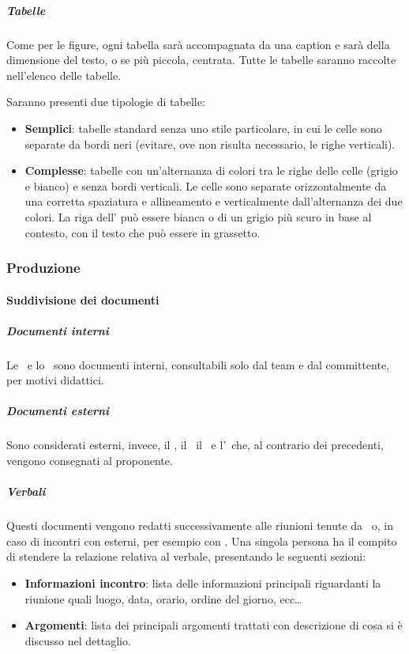 			\subparagraph{Tabelle}
			Come per le figure, ogni tabella sarà accompagnata da una caption e sarà della dimensione del testo, o se più piccola, centrata.
			Tutte le tabelle saranno raccolte nell'elenco delle tabelle.\par
			Saranno presenti due tipologie di tabelle:
			\begin{itemize}
				\item \textbf{Semplici}: tabelle standard senza uno stile particolare, in cui le celle sono separate da bordi neri (evitare, ove non risulta necessario,
					le righe verticali).
				\item \textbf{Complesse}: tabelle con un'alternanza di colori tra le righe delle celle (grigio e bianco) e senza bordi verticali.
					Le celle sono separate orizzontalmente da una corretta spaziatura e allineamento e verticalmente dall'alternanza dei due colori.
					La riga dell' può essere bianca o di un grigio più scuro in base al contesto, con il testo che può essere in grassetto.
			\end{itemize}


		\subsubsection{Produzione}

			\paragraph{Suddivisione dei documenti}

			\subparagraph{Documenti interni}
			Le \NdP\ e lo \SdF\ sono documenti interni, consultabili solo dal team e dal committente, per motivi didattici.

			\subparagraph{Documenti esterni}
			Sono considerati esterni, invece, il \PdP, il \PdQ\, il \Gl\ e l'\AdR\ che, al contrario dei precedenti, vengono consegnati al proponente.



			\subparagraph{Verbali}%
			Questi documenti vengono redatti successivamente alle riunioni tenute da \gruppo\
			o, in caso di incontri con  esterni, per esempio con \II. Una singola persona ha il compito di stendere
			la relazione relativa al verbale, presentando le seguenti sezioni:
			\begin{itemize}
				\item \textbf{Informazioni incontro}: lista delle informazioni principali riguardanti la riunione quali luogo, data, orario, ordine del giorno, ecc\dots
				\item \textbf{Argomenti}: lista dei principali argomenti trattati con descrizione di cosa si è discusso nel dettaglio.
				
			\end{itemize}


